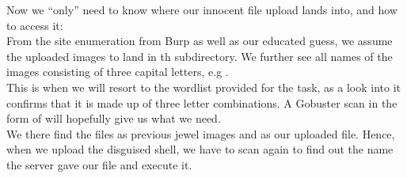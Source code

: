 {{Now we ``only'' need to know where our innocent file upload lands into, and how to access it:\\
From the site enumeration from Burp as well as our educated guess, we assume the uploaded images to land in th  subdirectory. We further see all names of the images consisting of three capital letters, e.g . \\
This is when we will resort to the wordlist provided for the task, as a look into it confirms that it is made up of three letter combinations. A Gobuster scan in the form of 
will hopefully give us what we need. \\
We there find the files  as previous jewel images and  as our uploaded file. Hence, when we upload the disguised shell, we have to scan again to find out the name the server gave our file and execute it.\\

}}
